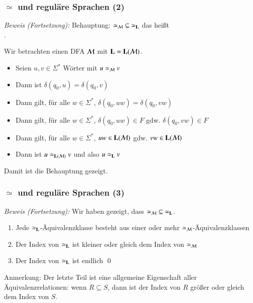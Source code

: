 \documentclass[onlymath]{beamer}
\begin{document}
\begin{frame}[t]\frametitle{$\simeq$ und reguläre Sprachen (2)}


\emph{Beweis (Fortsetzung):} 
Behauptung: ${\simeq_{\mathcal{M}}}\subseteq {\simeq_{\textbf{\textcolor{black}{L}}}}$ das heißt\\[1ex]
% 
.\medskip

Wir betrachten einen DFA $\mathcal{M}$ mit $\textbf{\textcolor{black}{L}}=\textbf{\textcolor{black}{L}}(\mathcal{M})$.\pause
\begin{itemize}
\item Seien $u,v\in\Sigma^*$ Wörter mit $u \simeq_{\mathcal{M}} v$\pause
\item Dann ist $\delta(q_0,u)=\delta(q_0,v)$\pause
\item Dann gilt, für alle $w\in\Sigma^*$, $\delta(q_0,uw)=\delta(q_0,vw)$\pause
\item Dann gilt, für alle $w\in\Sigma^*$, $\delta(q_0,uw)\in F$ gdw. $\delta(q_0,vw)\in F$\pause
\item Dann gilt, für alle $w\in\Sigma^*$, $uw\in \textbf{\textcolor{black}{L}}(\mathcal{M})$ gdw. $vw\in \textbf{\textcolor{black}{L}}(\mathcal{M})$\pause
\item Dann ist $u \simeq_{\textbf{\textcolor{black}{L}}(\mathcal{M})} v$ und also $u \simeq_{\textbf{\textcolor{black}{L}}} v$
\end{itemize}
Damit ist die Behauptung gezeigt.

\end{frame}

\begin{frame}[t]\frametitle{$\simeq$ und reguläre Sprachen (3)}


\emph{Beweis (Fortsetzung):} Wir haben gezeigt, dass ${\simeq_{\mathcal{M}}}\subseteq {\simeq_{\textbf{\textcolor{black}{L}}}}$.\pause
\medskip

\begin{enumerate}[$\leadsto$]
\item Jede ${\simeq_{\textbf{\textcolor{black}{L}}}}$-Äquivalenzklasse besteht aus einer oder mehr ${\simeq_{\mathcal{M}}}$-Äquivalenzklassen\pause
\item Der Index von ${\simeq_{\textbf{\textcolor{black}{L}}}}$ ist kleiner oder gleich dem Index von ${\simeq_{\mathcal{M}}}$\pause
\item Der Index von ${\simeq_{\textbf{\textcolor{black}{L}}}}$ ist endlich \qed
\end{enumerate}
\medskip

\textcolor{devilscss}{\footnotesize Anmerkung: Der letzte Teil ist eine allgemeine Eigenschaft aller Äquivalenzrelationen: wenn $R\subseteq S$, dann ist der Index von $R$ größer oder gleich dem Index von $S$.}

\end{frame}
\end{document}
